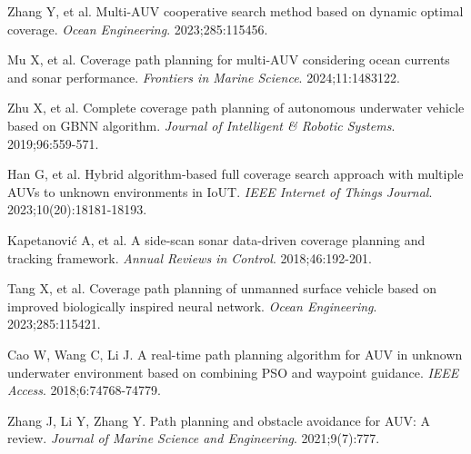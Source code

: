 \documentclass[compress]{cm}
\begin{document}
\begin{thebibliography}{99}
Zhang Y, et al. Multi-AUV cooperative search method based on dynamic optimal coverage. \textit{Ocean Engineering}. 2023;285:115456.

Mu X, et al. Coverage path planning for multi-AUV considering ocean currents and sonar performance. \textit{Frontiers in Marine Science}. 2024;11:1483122.

Zhu X, et al. Complete coverage path planning of autonomous underwater vehicle based on GBNN algorithm. \textit{Journal of Intelligent \& Robotic Systems}. 2019;96:559-571.

Han G, et al. Hybrid algorithm-based full coverage search approach with multiple AUVs to unknown environments in IoUT. \textit{IEEE Internet of Things Journal}. 2023;10(20):18181-18193.

Kapetanović A, et al. A side-scan sonar data-driven coverage planning and tracking framework. \textit{Annual Reviews in Control}. 2018;46:192-201.

Tang X, et al. Coverage path planning of unmanned surface vehicle based on improved biologically inspired neural network. \textit{Ocean Engineering}. 2023;285:115421.

Cao W, Wang C, Li J. A real-time path planning algorithm for AUV in unknown underwater environment based on combining PSO and waypoint guidance. \textit{IEEE Access}. 2018;6:74768-74779.

Zhang J, Li Y, Zhang Y. Path planning and obstacle avoidance for AUV: A review. \textit{Journal of Marine Science and Engineering}. 2021;9(7):777.

\end{thebibliography}
\end{document}
